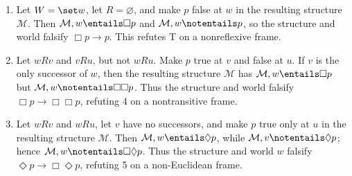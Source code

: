 \begin{example}
\begin{enumerate}
  \item Let \(W=\set w\), let \(R=\varnothing\), and make \(p\) false at
        \(w\) in the resulting structure \(\mathcal M\).  Then
        \(\mathcal M,w\entails\Box p\) and
        \(\mathcal M,w\notentails p\), so the structure and world falsify
        \(\Box p\to p\).  This refutes T on a nonreflexive frame.
  \item Let \(wRv\) and \(vRu\), but not \(wRu\).  Make \(p\) true at \(v\)
        and false at \(u\).  If \(v\) is the only successor of \(w\), then
        the resulting structure \(\mathcal M\) has
        \(\mathcal M,w\entails\Box p\) but
        \(\mathcal M,w\notentails\Box\Box p\).  Thus the structure and world
        falsify \(\Box p\to\Box\Box p\), refuting 4 on a nontransitive frame.
  \item Let \(wRv\) and \(wRu\), let \(v\) have no successors, and make \(p\)
        true only at \(u\) in the resulting structure \(\mathcal M\).  Then
        \(\mathcal M,w\entails\Diamond p\), while
        \(\mathcal M,v\notentails\Diamond p\); hence
        \(\mathcal M,w\notentails\Box\Diamond p\).  Thus the structure and
        world \(w\) falsify
        \(\Diamond p\to\Box\Diamond p\), refuting 5 on a non-Euclidean frame.
\end{enumerate}
\end{example}

